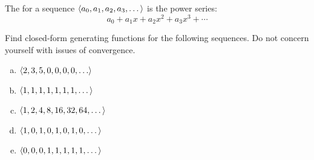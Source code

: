 \documentclass[12pt]{article}
\begin{document}


The  for a sequence $\left\langle a_0, a_1,
a_2, a_3, \dots\right\rangle$ is the power series:
%
\[
a_0 + a_1 x + a_2 x^2 + a_3 x^3 + \cdots
\]



Find closed-form generating functions for the following sequences.  Do
not concern yourself with issues of convergence.

\begin{enumerate}[(a)]

\item $\left\langle2, 3, 5, 0, 0, 0 , 0, \ldots\right\rangle$

\solution[\vspace{0.25in}]{
\[
2 + 3x + 5x^2
\]
}

\item $\left\langle1, 1, 1, 1,1 ,1, 1, \dots\right\rangle$

\solution[\vspace{0.25in}]{
\[
1 + x + x^2 + x^3 + \ldots = \frac{1}{1 - x}
\]
}

\item $\left\langle1, 2, 4, 8, 16, 32, 64, \dots\right\rangle$


\item $\left\langle1, 0, 1, 0, 1, 0, 1, 0, \dots\right\rangle$


\item $\left\langle0, 0, 0, 1, 1, 1, 1, 1, \dots\right\rangle$



\end{enumerate}
\end{document}
